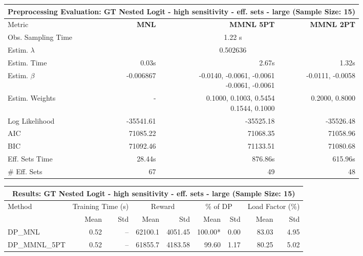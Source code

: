 
\begin{samepage}
\begin{center}
  \small
  \begin{tabular}{l|r|r|r}
    \toprule
    \multicolumn{4}{c}{\textbf{Preprocessing Evaluation: GT Nested Logit - high sensitivity - eff. sets - large (Sample Size: 15)}} \\
    \midrule
    Metric & \textbf{MNL} & \textbf{MMNL 5PT} & \textbf{MMNL 2PT} \\
    \midrule
    Obs. Sampling Time & \multicolumn{3}{c}{1.22 s} \\
    Estim. $\lambda$ & \multicolumn{3}{c}{0.502636} \\
    Estim. Time & 0.03s & 2.67s & 1.32s \\
    Estim. $\beta$ & -0.006867 & \makecell[tr]{-0.0140, -0.0061, -0.0061 \\ -0.0061, -0.0061} & -0.0111, -0.0058 \\
    Estim. Weights & - & \makecell[tr]{0.1000, 0.1003, 0.5454 \\ 0.1544, 0.1000} & 0.2000, 0.8000 \\
    Log Likelihood & -35541.61 & -35525.18 & -35526.48 \\
    AIC & 71085.22 & 71068.35 & 71058.96 \\
    BIC & 71092.46 & 71133.51 & 71080.68 \\
    Eff. Sets Time & 28.44s & 876.86s & 615.96s \\
    \# Eff. Sets & 67 & 49 & 48 \\
    \bottomrule
  \end{tabular}
\end{center}
\begin{center}
  \small
  \begin{tabular}{l|rr|rr|rr|rr}
    \toprule
    \multicolumn{9}{c}{\textbf{Results: GT Nested Logit - high sensitivity - eff. sets - large (Sample Size: 15)}} \\
    \midrule
    Method & \multicolumn{2}{c|}{Training Time (s)} & \multicolumn{2}{c|}{Reward} & \multicolumn{2}{c|}{\% of DP} & \multicolumn{2}{c}{Load Factor (\%)} \\
    & Mean & Std & Mean & Std & Mean & Std & Mean & Std \\
    \midrule
    DP\_MNL      &     0.52 &    -- &    62100.1 &    4051.45 & 100.00* &    0.00 &   83.03 &    4.95 \\
    DP\_MMNL\_5PT &     0.52 &    -- &    61855.7 &    4183.58 &   99.60 &    1.17 &   80.25 &    5.02 \\

\end{tabular}
\end{center}
\end{samepage}
